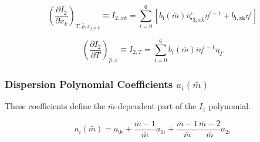 \documentclass[12pt, letterpaper]{article}
\begin{document}

\begin{equation}
    \left(\frac{\partial I_{2}}{\partial x_{k}}\right)_{T,\hat{\rho},x_{j\neq k}}
    \equiv I_{2,xk}
    =\sum_{i=0}^{6}[b_{\mathrm{i}}(\bar{m})i\zeta_{3,xk}\eta^{i-1}+b_{\mathrm{i,xk}}\eta^{i}]
    \label{eq:i2_xk}
\end{equation}


\begin{equation}
    \left(\frac{\partial I_2}{\partial T}\right)_{\hat{\rho},x}
    \equiv I_{2,T}
    =\sum_{i=0}^{6}b_i(\bar m)i\eta^{i-1}\eta_T
    \label{eq:i2_dT}
\end{equation}

\subsubsection{Dispersion Polynomial Coefficients \(a_i(\bar m)\)}

These coefficients define the \(\bar m\)-dependent part of the \(I_1\) polynomial.

\begin{equation}
    a_{i}(\bar{m})=a_{0 i}+\frac{\bar{m}-1}{\bar{m}} a_{1 i}+\frac{\bar{m}-1}{\bar{m}} \frac{\bar{m}-2}{\bar{m}} a_{2 i}
    \label{eq:a_i_mbar}
\end{equation}

\end{document}
